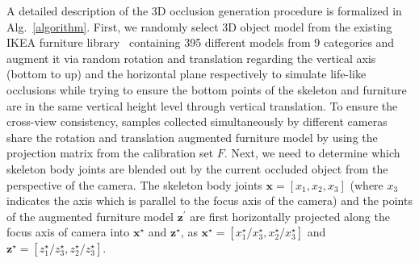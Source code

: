 \documentclass[lettersize,journal]{IEEEtran}
\begin{document}
A detailed description of the 3D occlusion generation procedure is formalized in Alg.~\ref{algorithm}. 
First, we randomly select 3D object model from the existing IKEA furniture library~\cite{sun2018pix3d} containing 395 different models from 9 categories and augment it via random rotation and translation regarding the vertical axis (bottom to up) and the horizontal plane respectively to simulate life-like occlusions while trying to ensure the bottom points of the skeleton and furniture are in the same vertical height level through vertical translation.
To ensure the cross-view consistency, samples collected simultaneously by different cameras share the rotation and translation augmented furniture model by using the projection matrix from the calibration set $F$.
Next, we need to determine which skeleton body joints are blended out by the current occluded object from the perspective of the camera.
The skeleton body joints $\textbf{x}=[x_1,x_2,x_3]$ (where $x_3$ indicates the axis which is parallel to the focus axis of the camera) and the points of the augmented furniture model $\textbf{z}^{'}$ are first horizontally projected along the focus axis of camera into $\textbf{x}^{\star}$ and $\textbf{z}^{\star}$, as $\textbf{x}^{\star} = [x_1^{\star}/x_3^{\star},x_2^{\star}/x_3^{\star}]$ and $\textbf{z}^{\star} = [z_1^{\star}/z_3^{\star},z_2^{\star}/z_3^{\star}]$.
\end{document}
